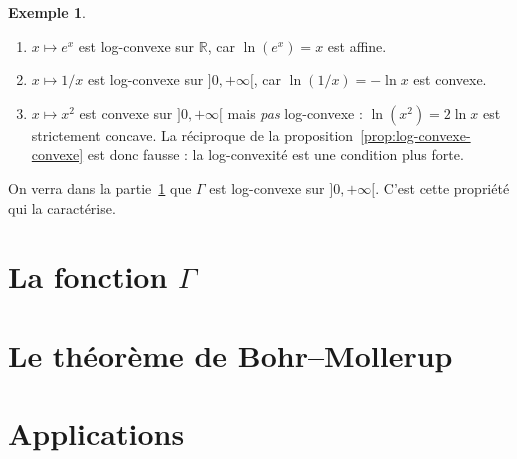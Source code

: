 \documentclass[11pt,a4paper]{amsart}
\theoremstyle{plain}
\theoremstyle{definition}
\newtheorem{exemple}[theoreme]{Exemple}
\theoremstyle{remark}
\numberwithin{equation}{section}
\newcommand{\R}{\mathbb{R}}
\begin{document}
\begin{exemple}\label{ex:log-convexe}
\begin{enumerate}[label=(\arabic*)]
  \item $x\mapsto e^{x}$ est log-convexe sur $\R$, car $\ln(e^x)=x$ est
  affine.
  \item $x\mapsto 1/x$ est log-convexe sur $]0,+\infty[$, car
  $\ln(1/x)=-\ln x$ est convexe.
  \item $x\mapsto x^2$ est convexe sur $]0,+\infty[$ mais \emph{pas}
  log-convexe : $\ln(x^2)=2\ln x$ est strictement concave. La réciproque de
  la proposition~\ref{prop:log-convexe-convexe} est donc fausse : la
  log-convexité est une condition plus forte.
\end{enumerate}
On verra dans la partie~\ref{sec:gamma} que $\Gamma$ est log-convexe sur
$]0,+\infty[$. C'est cette propriété qui la caractérise.
\end{exemple}


\section{La fonction \texorpdfstring{$\Gamma$}{Gamma}}\label{sec:gamma}

\section{Le théorème de Bohr--Mollerup}

\section{Applications}

\end{document}
